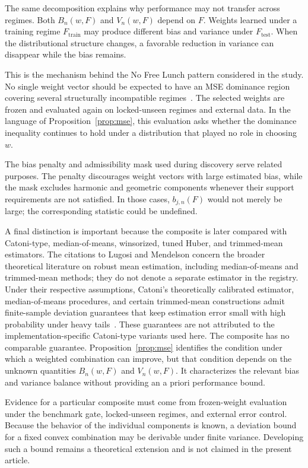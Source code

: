 The same decomposition explains why performance may not transfer across regimes. Both $B_n(w,F)$ and $V_n(w,F)$ depend on $F$. Weights learned under a training regime $F_{\mathrm{train}}$ may produce different bias and variance under $F_{\mathrm{test}}$. When the distributional structure changes, a favorable reduction in variance can disappear while the bias remains.

This is the mechanism behind the No Free Lunch pattern considered in the study. No single weight vector should be expected to have an MSE dominance region covering several structurally incompatible regimes~\citep{sterkenburg2021nfl,goldblum2024nfl}. The selected weights are frozen and evaluated again on locked-unseen regimes and external data. In the language of Proposition~\ref{prop:mse}, this evaluation asks whether the dominance inequality continues to hold under a distribution that played no role in choosing $w$.

The bias penalty and admissibility mask used during discovery serve related purposes. The penalty discourages weight vectors with large estimated bias, while the mask excludes harmonic and geometric components whenever their support requirements are not satisfied. In those cases, $b_{j,n}(F)$ would not merely be large; the corresponding statistic could be undefined.

A final distinction is important because the composite is later compared with Catoni-type, median-of-means, winsorized, tuned Huber, and trimmed-mean estimators. The citations to Lugosi and Mendelson concern the broader theoretical literature on robust mean estimation, including median-of-means and trimmed-mean methods; they do not denote a separate estimator in the registry. Under their respective assumptions, Catoni's theoretically calibrated estimator, median-of-means procedures, and certain trimmed-mean constructions admit finite-sample deviation guarantees that keep estimation error small with high probability under heavy tails~\citep{catoni2012challenging,lugosi2019mean,lugosi2021trimmed}. These guarantees are not attributed to the implementation-specific Catoni-type variants used here. The composite has no comparable guarantee. Proposition~\ref{prop:mse} identifies the condition under which a weighted combination can improve, but that condition depends on the unknown quantities $B_n(w,F)$ and $V_n(w,F)$. It characterizes the relevant bias and variance balance without providing an a priori performance bound.

Evidence for a particular composite must come from frozen-weight evaluation under the benchmark gate, locked-unseen regimes, and external error control. Because the behavior of the individual components is known, a deviation bound for a fixed convex combination may be derivable under finite variance. Developing such a bound remains a theoretical extension and is not claimed in the present article.

